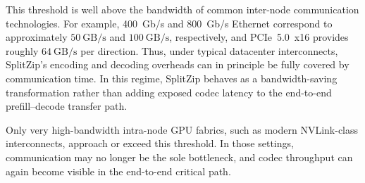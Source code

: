 This threshold is well above the bandwidth of common inter-node communication technologies. For example, 400~Gb/s and 800~Gb/s Ethernet correspond to approximately $50~\mathrm{GB/s}$ and $100~\mathrm{GB/s}$, respectively, and PCIe~5.0~x16 provides roughly $64~\mathrm{GB/s}$ per direction. 
Thus, under typical datacenter interconnects, SplitZip's encoding and decoding overheads can in principle be fully covered by communication time. 
In this regime, SplitZip behaves as a bandwidth-saving transformation rather than adding exposed codec latency to the end-to-end prefill--decode transfer path.

Only very high-bandwidth intra-node GPU fabrics, such as modern NVLink-class interconnects, approach or exceed this threshold. In those settings, communication may no longer be the sole bottleneck, and codec throughput can again become visible in the end-to-end critical path.
